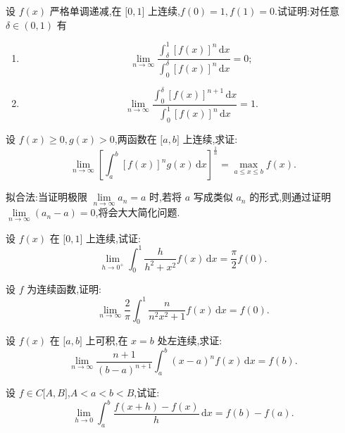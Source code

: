 \documentclass[../数学分析培优讲义.tex]{subfiles}
\begin{document}
\begin{example}
设 $f(x)$ 严格单调递减,在 $\lbrack 0,1\rbrack$ 上连续,$f(0)=1,f(1)=0$.试证明:对任意 $\delta\in(0,1)$ 有
\begin{enumerate}[label=(\arabic*)]
    \item
    \[
        \lim\limits_{n\to\infty}
        \dfrac{\displaystyle\int_\delta^1[f(x)]^n\,\mathrm{d}x}
        {\displaystyle\int_0^\delta[f(x)]^n\,\mathrm{d}x}=0;
    \]
    \item
    \[
        \lim\limits_{n\to\infty}
        \dfrac{\displaystyle\int_0^\delta[f(x)]^{n+1}\,\mathrm{d}x}
        {\displaystyle\int_0^1[f(x)]^n\,\mathrm{d}x}=1.
    \]
\end{enumerate}
\end{example}
\exampleblank

\begin{example}[\markstar]
设 $f(x)\geq0,g(x)>0$,两函数在 $\lbrack a,b\rbrack$ 上连续,求证:
\[
    \lim\limits_{n\to\infty}
    \left[\int_a^b[f(x)]^n g(x)\,\mathrm{d}x\right]^{\frac{1}{n}}
    =\max\limits_{a\leq x\leq b}f(x).
\]
\end{example}
\exampleblank

拟合法:当证明极限 $\displaystyle\lim\limits_{n\to\infty}a_n=a$ 时,若将 $a$ 写成类似 $a_n$ 的形式,则通过证明 $\displaystyle\lim\limits_{n\to\infty}(a_n-a)=0$,将会大大简化问题.

\begin{example}
设 $f(x)$ 在 $\lbrack 0,1\rbrack$ 上连续,试证:
\[
    \lim\limits_{h\to0^+}\int_0^1\dfrac{h}{h^2+x^2}f(x)\,\mathrm{d}x
    =\dfrac{\pi}{2}f(0).
\]
\end{example}
\exampleblank

\begin{example}
设 $f$ 为连续函数,证明:
\[
    \lim\limits_{n\to\infty}\dfrac{2}{\pi}
    \int_0^1\dfrac{n}{n^2x^2+1}f(x)\,\mathrm{d}x=f(0).
\]
\end{example}
\exampleblank

\begin{example}
设 $f(x)$ 在 $\lbrack a,b\rbrack$ 上可积,在 $x=b$ 处左连续,求证:
\[
    \lim\limits_{n\to\infty}
    \dfrac{n+1}{(b-a)^{n+1}}
    \int_a^b(x-a)^n f(x)\,\mathrm{d}x=f(b).
\]
\end{example}
\exampleblank

\begin{example}
设 $f\in C\lbrack A,B\rbrack$,$A<a<b<B$,试证:
\[
    \lim\limits_{h\to0}\int_a^b\dfrac{f(x+h)-f(x)}{h}\,\mathrm{d}x
    =f(b)-f(a).
\]
\end{example}
\exampleblank
\end{document}
